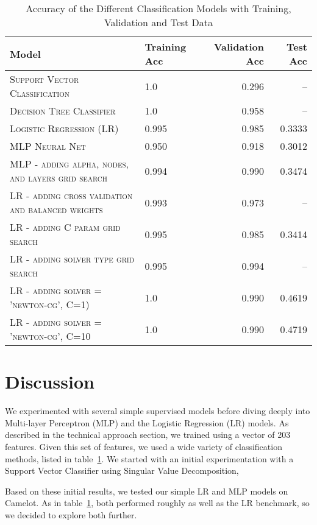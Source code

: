 \documentclass[11pt]{article}
\begin{document}
\begin{table}
\centering
\begin{tabular}{llrr}
 \toprule
 Model & Training Acc & Validation Acc & Test Acc \\
 \midrule
 \textsc{Support Vector Classification} &  1.0  &  0.296 & -- \\
 \textsc{Decision Tree Classifier} &  1.0 &  0.958  & -- \\
 \textsc{Logistic Regression (LR)} &  0.995 &  0.985 &  0.3333\\
 \textsc{MLP Neural Net} &  0.950 &  0.918 & 0.3012 \\
 \textsc{MLP - adding alpha, nodes, and layers grid search} &   0.994 &  0.990  & 0.3474 \\
 \textsc{LR - adding cross validation and balanced weights} &  0.993 &  0.973 &  -- \\
 \textsc{LR - adding C param grid search} &  0.995 &  0.985 &  0.3414 \\
 \textsc{LR - adding solver type grid search} &  0.995 &  0.994 &  -- \\
 \textsc{LR - adding solver = 'newton-cg', C=1) } &  1.0 &  0.990 & 0.4619 \\
 \textsc{LR - adding solver = 'newton-cg', C=10 } &  1.0 &  0.990 &  0.4719 \\

 \bottomrule
\end{tabular}
\caption{\label{tab:results} Accuracy of the Different Classification Models with Training, Validation and Test Data}
\end{table}







\section{Discussion} 

We experimented with several simple supervised models before diving deeply into Multi-layer Perceptron (MLP)  and the Logistic Regression (LR) models. As described in the technical approach section, we trained using a vector of 203 features. Given this set of features, we used a wide variety of classification methods, listed in table~\ref{tab:results}. We started with an initial experimentation with a Support Vector Classifier using Singular Value Decomposition, 

Based on these initial results, we tested our simple LR and MLP models on Camelot. As in table~\ref{tab:results}, both performed roughly as well as the LR benchmark, so we decided to explore both further. 
\end{document}
